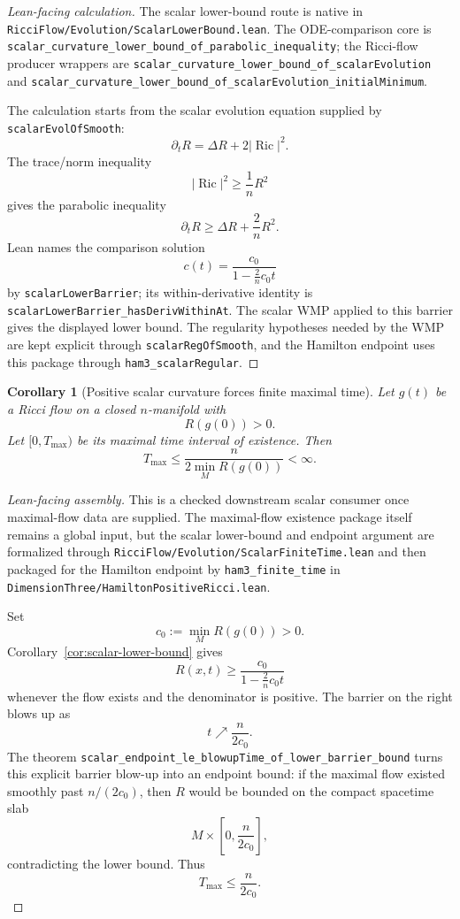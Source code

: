 \documentclass[11pt]{article}
\theoremstyle{plain}
\newtheorem{corollary}[theorem]{Corollary}
\theoremstyle{definition}
\theoremstyle{remark}
\newcommand{\Ric}{\operatorname{Ric}}
\newcommand{\norm}[1]{\left|#1\right|}
\newcommand{\leanref}[1]{\nolinkurl{#1}}
\newcommand{\leanfile}[1]{\nolinkurl{#1}}
\newcommand{\rffile}[1]{\leanfile{#1}}
\begin{document}
\begin{proof}[Lean-facing calculation]
The scalar lower-bound route is native in
\rffile{RicciFlow/Evolution/ScalarLowerBound.lean}.  The ODE-comparison core is
\leanref{scalar_curvature_lower_bound_of_parabolic_inequality}; the Ricci-flow
producer wrappers are
\leanref{scalar_curvature_lower_bound_of_scalarEvolution} and
\leanref{scalar_curvature_lower_bound_of_scalarEvolution_initialMinimum}.

The calculation starts from the scalar evolution equation supplied by
\leanref{scalarEvolOfSmooth}:
\[
  \partial_tR=\Delta R+2\norm{\Ric}^2.
\]
The trace/norm inequality
\[
  \norm{\Ric}^2\ge \frac1n R^2
\]
gives the parabolic inequality
\[
  \partial_tR
  \ge
  \Delta R+\frac2nR^2.
\]
Lean names the comparison solution
\[
  c(t)=\frac{c_0}{1-\frac2n c_0t}
\]
by \leanref{scalarLowerBarrier}; its within-derivative identity is
\leanref{scalarLowerBarrier_hasDerivWithinAt}.  The scalar WMP applied to this
barrier gives the displayed lower bound.  The regularity hypotheses needed by
the WMP are kept explicit through \leanref{scalarRegOfSmooth}, and the Hamilton
endpoint uses this package through \leanref{ham3_scalarRegular}.
\end{proof}

\begin{corollary}[Positive scalar curvature forces finite maximal time]
\label{cor:positive-scalar-finite-time}
Let $g(t)$ be a Ricci flow on a closed $n$-manifold with
\[
R(g(0))>0.
\]
Let $[0,T_{\max})$ be its maximal time interval of existence. Then
\[
T_{\max}
\le
\frac{n}{2\min_M R(g(0))}
<\infty .
\]
\end{corollary}

\begin{proof}[Lean-facing assembly]
This is a checked downstream scalar consumer once maximal-flow data are
supplied.  The maximal-flow existence package itself remains a global input,
but the scalar lower-bound and endpoint argument are formalized through
\rffile{RicciFlow/Evolution/ScalarFiniteTime.lean} and then packaged for the
Hamilton endpoint by \leanref{ham3_finite_time} in
\rffile{DimensionThree/HamiltonPositiveRicci.lean}.

Set
\[
  c_0:=\min_M R(g(0))>0.
\]
Corollary~\ref{cor:scalar-lower-bound} gives
\[
  R(x,t)\ge \frac{c_0}{1-\frac2n c_0t}
\]
whenever the flow exists and the denominator is positive.  The barrier on the
right blows up as
\[
  t\nearrow \frac{n}{2c_0}.
\]
The theorem \leanref{scalar_endpoint_le_blowupTime_of_lower_barrier_bound}
turns this explicit barrier blow-up into an endpoint bound: if the maximal flow
existed smoothly past $n/(2c_0)$, then $R$ would be bounded on the compact
spacetime slab
\[
  M\times\left[0,\frac{n}{2c_0}\right],
\]
contradicting the lower bound.  Thus
\[
  T_{\max}\le \frac{n}{2c_0}.
\]
\end{proof}
\end{document}
